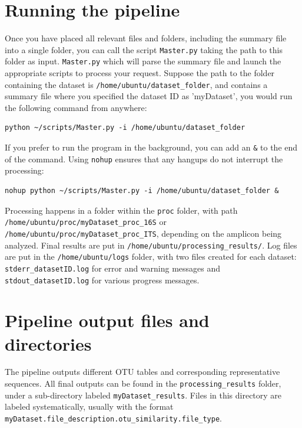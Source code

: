 \documentclass[11pt, oneside]{article}   	%
\begin{document}
\section{Running the pipeline}
Once you have placed all relevant files and folders, including the summary file into a single folder, you can call the script {\tt Master.py} taking the path to this folder as input.  {\tt Master.py} which will parse the summary file and launch the appropriate scripts to process your request.  Suppose the path to the folder containing the dataset is {\tt /home/ubuntu/dataset\_folder}, and contains a summary file where you specified the dataset ID as 'myDataset', you would run the following command from anywhere:
\begin{verbatim}
python ~/scripts/Master.py -i /home/ubuntu/dataset_folder
\end{verbatim}
If you prefer to run the program in the background, you can add an {\tt \&} to the end of the command. Using {\tt nohup} ensures that any hangups do not interrupt the processing:
\begin{verbatim}
nohup python ~/scripts/Master.py -i /home/ubuntu/dataset_folder &
\end{verbatim}
Processing happens in a folder within the {\tt proc} folder, with path {\tt /home/ubuntu/proc/myDataset\_proc\_16S} or {\tt /home/ubuntu/proc/myDataset\_proc\_ITS}, depending on the amplicon being analyzed.  Final results are put in {\tt /home/ubuntu/processing\_results/}. Log files are put in the {\tt /home/ubuntu/logs} folder, with two files created for each dataset: {\tt stderr\_datasetID.log} for error and warning messages and {\tt stdout\_datasetID.log} for various progress messages.

\section{Pipeline output files and directories}
The pipeline outputs different OTU tables and corresponding representative sequences. All final outputs can be found in the {\tt processing\_results} folder, under a sub-directory labeled {\tt myDataset\_results}. Files in this directory are labeled systematically, usually with the format {\tt myDataset.file\_description.otu\_similarity.file\_type}. 
\end{document}
